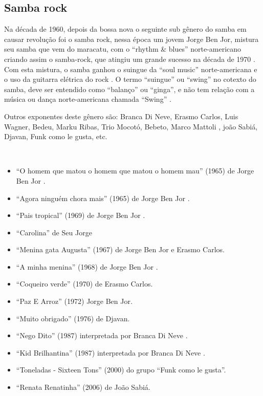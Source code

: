 \subsection{Samba rock}

Na década de 1960, depois da bossa nova o seguinte sub gênero do samba em causar revolução foi o samba rock,
nessa época um jovem Jorge Ben Jor, mistura seu samba que vem do maracatu,
com o ``rhythm \& blues'' norte-americano criando assim o samba-rock, 
que atingiu um grande sucesso na década de 1970 \cite{petillo2012curtindo} \cite[pp. 166]{sanches2000tropicalismo}.
Com esta mistura, 
o samba ganhou o suingue da  ``soul music'' norte-americana 
e o uso da guitarra elétrica do rock  \cite{petillo2012curtindo}.
O termo ``suingue'' ou ``swing'' no cotexto do samba, 
deve ser entendido como ``balanço'' ou ``ginga'', 
e não tem relação com a música ou dança norte-americana chamada ``Swing'' \cite[pp. 131]{perna2002samba}. 

Outros exponentes deste gênero são: 
Branca Di Neve,
Erasmo Carlos,
Luis Wagner,
Bedeu,
Marku Ribas,
Trio Mocotó,
Bebeto,
Marco Mattoli \cite[pp. 301]{de2003tem},
joão Sabiá,
Djavan,
Funk como le gusta,
 etc.
\begin{example} ~

\begin{itemize}
\item ``O homem que matou o homem que matou o homem mau'' (1965) de Jorge Ben Jor \cite[pp. 301]{de2003tem}.
\item ``Agora ninguém chora mais'' (1965) de Jorge Ben Jor \cite[pp. 301]{de2003tem}.
\item ``Pais tropical'' (1969) de Jorge Ben Jor \cite[pp. 188]{moehn2012contemporary}.
\item ``Carolina'' de Seu Jorge \cite[pp. 258]{2001raca}
\item ``Menina gata Augusta'' (1967) de Jorge Ben Jor e Erasmo Carlos.
\item ``A minha menina'' (1968) de Jorge Ben Jor \cite[pp. 232]{diniz2006almanaque}.
\item ``Coqueiro verde'' (1970) de Erasmo Carlos.
\item ``Paz E Arroz'' (1972) Jorge Ben Jor.
\item ``Muito obrigado'' (1976) de Djavan.
\item ``Nego Dito'' (1987) interpretada por Branca Di Neve \cite{BrancaDiNeve1987}.
\item ``Kid Brilhantina'' (1987)  interpretada por Branca Di Neve \cite{BrancaDiNeve1987}.

\item ``Toneladas - Sixteen Tons'' (2000) do grupo ``Funk como le gusta''.
\item ``Renata Renatinha'' (2006) de João Sabiá.
\end{itemize}
\end{example}


